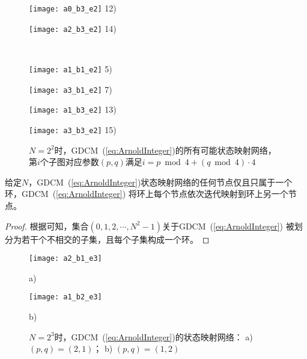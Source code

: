 \begin{figure}[!htb]
\begin{minipage}[b]{\FourImW}
\centering
\texttt{[image: a0\_b3\_e2]}
12)
\end{minipage}
\begin{minipage}[b]{\FourImW}
\centering
\texttt{[image: a2\_b3\_e2]}
14)
\end{minipage}  \\
\begin{minipage}[b]{\FourImW}
\centering
\texttt{[image: a1\_b1\_e2]}
5)
\end{minipage}
\begin{minipage}[b]{\FourImW}
\centering
\texttt{[image: a3\_b1\_e2]}
7)
\end{minipage}
\begin{minipage}[b]{\FourImW}
\centering
\texttt{[image: a1\_b3\_e2]}
13)
\end{minipage}
\begin{minipage}[b]{\FourImW}
\centering
\texttt{[image: a3\_b3\_e2]}
15)
\end{minipage}
\caption{$N=2^2$时，GDCM~(\ref{eq:ArnoldInteger})的所有可能状态映射网络，
第$i$个子图对应参数$(p, q)$满足$i=p\bmod 4+(q\bmod 4)\cdot 4$}
\label{Functionalgraphse1}
\end{figure}

\begin{Property}
给定$N$，GDCM~(\ref{eq:ArnoldInteger})状态映射网络的任何节点仅且只属于一个环，GDCM~(\ref{eq:ArnoldInteger})
将环上每个节点依次迭代映射到环上另一个节点。
\label{prop:onecycle}
\end{Property}
\begin{proof}
根据\cite[Theorem 5.1.1]{hall1959marshall}可知，集合$(0, 1, 2, \cdots, N^{2}-1)$关于GDCM~(\ref{eq:ArnoldInteger})
被划分为若干个不相交的子集，且每个子集构成一个环。\qedsymbol
\end{proof}

\begin{figure}[!htb]
\centering
\begin{minipage}{\BigTwoImW}
\centerline{\texttt{[image: a2\_b1\_e3]}}
    \centerline{a)}
\end{minipage}\hspace{\figsep}
\begin{minipage}{\BigTwoImW}
 \centerline{\texttt{[image: a1\_b2\_e3]}}
    \centerline{b)}
\end{minipage}
\caption{$N=2^3$时，GDCM~(\ref{eq:ArnoldInteger})的状态映射网络：
a) $(p, q)=(2, 1)$； b) $(p, q)=(1, 2)$}
\label{fig:Figure3d3c}
\end{figure}

